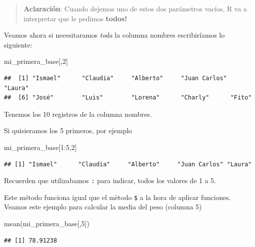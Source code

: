 \documentclass[
]{book}
\newenvironment{Shaded}{\begin{snugshade}}{\end{snugshade}}
\newcommand{\DecValTok}[1]{\textcolor[rgb]{0.00,0.00,0.81}{#1}}
\newcommand{\FunctionTok}[1]{\textcolor[rgb]{0.00,0.00,0.00}{#1}}
\newcommand{\NormalTok}[1]{#1}
\newcommand{\SpecialCharTok}[1]{\textcolor[rgb]{0.00,0.00,0.00}{#1}}
\begin{document}
\begin{quote}
\textbf{Aclaración}: Cuando dejemos uno de estos dos parámetros vacíos, R va a interpretar que le pedimos \textbf{todos!}
\end{quote}

Veamos ahora si necesitaramos \emph{toda} la columna nombres escribiríamos lo siguiente:

\begin{Shaded}
\begin{Highlighting}[]
\NormalTok{mi\_primera\_base[,}\DecValTok{2}\NormalTok{]}
\end{Highlighting}
\end{Shaded}

\begin{verbatim}
##  [1] "Ismael"      "Claudia"     "Alberto"     "Juan Carlos" "Laura"      
##  [6] "José"        "Luis"        "Lorena"      "Charly"      "Fito"
\end{verbatim}

Tenemos los 10 registros de la columna nombres.

Si quisieramos los 5 primeros, por ejemplo

\begin{Shaded}
\begin{Highlighting}[]
\NormalTok{mi\_primera\_base[}\DecValTok{1}\SpecialCharTok{:}\DecValTok{5}\NormalTok{,}\DecValTok{2}\NormalTok{]}
\end{Highlighting}
\end{Shaded}

\begin{verbatim}
## [1] "Ismael"      "Claudia"     "Alberto"     "Juan Carlos" "Laura"
\end{verbatim}

Recuerden que utilizabamos \texttt{:} para indicar, todos los valores de 1 a 5.

Este método funciona igual que el mètodo \texttt{\$} a la hora de aplicar funciones.
Veamos este ejemplo para calcular la media del peso (columna 5)

\begin{Shaded}
\begin{Highlighting}[]
\FunctionTok{mean}\NormalTok{(mi\_primera\_base[,}\DecValTok{5}\NormalTok{])}
\end{Highlighting}
\end{Shaded}

\begin{verbatim}
## [1] 78.91238
\end{verbatim}
\end{document}

